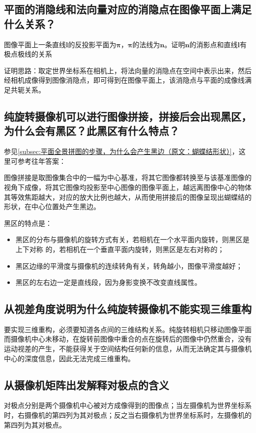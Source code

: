 \documentclass[11pt]{article}
\begin{document}
\subsection{平面的消隐线和法向量对应的消隐点在图像平面上满足什么关系？}
{\heiti 图像平面上一条直线$\mathbf{l}$的反投影平面为$\mathbold{\pi}$，$\mathbold{\pi}$的法线为$\mathbf{n}$。证明$\mathbf{n}$的消影点和直线$\mathbf{l}$有极点极线的关系}\par
证明思路：取定世界坐标系在相机上，将法向量的消隐点在空间中表示出来，然后经相机成像得到图像消隐点，即可得到在图像平面上，该消隐点与平面的成像线满足共轭关系。
\subsection{纯旋转摄像机可以进行图像拼接，拼接后会出现黑区，为什么会有黑区？此黑区有什么特点？}
参见\ref{subsec:平面全景拼图的步骤，为什么会产生黑边（原文：蝴蝶结形状）}，这里可参考往年答案：\par
图像拼接是取图像集合中的一幅为中心基准，将其它图像都转换至与该基准图像的视角下成像，将其它图像均投影至中心图像的图像平面上，越远离图像中心的物体其等效焦距越大，对应的放大比例也越大，从而使用拼接后的图像呈现出蝴蝶结的形状，在中心位置处产生黑边。\par
黑区的特点是：
\begin{itemize}
  \item 黑区的分布与摄像机的旋转方式有关，若相机在一个水平面内旋转，则黑区是上下对称 的，若相机在一个垂直平面内旋转，则黑区是左右对称的；
  \item 黑区边缘的平滑度与摄像机的连续转角有关，转角越小，图像平滑度越好；
  \item 黑区的左右边一定是直线段，因为身影变换不改变直线属性。
\end{itemize}
\subsection{从视差角度说明为什么纯旋转摄像机不能实现三维重构}
要实现三维重构，必须要知道各点间的三维结构关系。纯旋转相机只移动图像平面而摄像机中心未移动，在旋转前图像中重合的点在旋转后的图像中仍然重合，没有运动视差的产生，不能获得关于空间结构任何新的信息，从而无法确定其与摄像机中心的深度信息，因此无法完成三维重构。
\subsection{从摄像机矩阵出发解释对极点的含义}
对极点分别是两个摄像机中心被对方成像得到的图像点；当左摄像机为世界坐标系时，右摄像机的第四列为其对极点；反之当右摄像机为世界坐标系时，左摄像机的第四列为其对极点。
\end{document}

